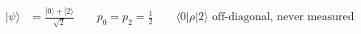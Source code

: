 \documentclass[12pt]{article}
\begin{document}
\fontsize{22}{28}\selectfont
\begin{align*}
|\psi\rangle &= \frac{|0\rangle+|2\rangle}{\sqrt{2}}
      \qquad
      p_0=p_2=\tfrac12
      \qquad
      \langle 0|\rho|2\rangle\text{ off-diagonal, never measured}
\end{align*}
\end{document}
